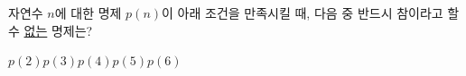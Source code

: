 자연수 $n$에 대한 명제 $p(n)$이 아래 조건을 만족시킬 때, 다음 중 반드시 참이라고 할 수 \underline{없는} 명제는? 
\begin{choices32}{$p(2)$}{$p(3)$}{$p(4)$}{$p(5)$}{$p(6)$}\end{choices32}
